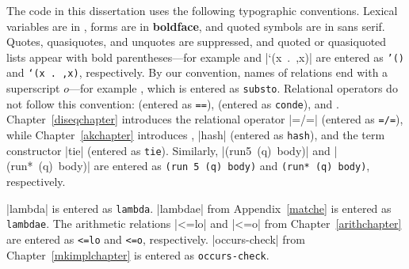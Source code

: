 The code in this dissertation uses the following typographic conventions.  Lexical variables are in , forms are in {\bf boldface}, and quoted symbols are in {\sf sans serif}.
Quotes, quasiquotes, and unquotes are suppressed,
and quoted or quasiquoted lists appear with bold parentheses---for example  and \mbox{\scheme|`(x . ,x)|} are entered as
\qqmagicoff 
\texttt{'()} and \mbox{\texttt{`(x . \!,x)}}, respectively.
\qqmagicon 
By our convention, names of relations end with a superscript $o$---for example , which is entered as {\tt substo}.  Relational operators do not follow this convention:  \scheme{==} (entered as {\tt ==}),  (entered as {\tt conde}), and .  Chapter~\ref{diseqchapter} introduces the relational operator \scheme|=/=| (entered as {\tt =/=}), while Chapter~\ref{akchapter} introduces , \scheme|hash| (entered as {\tt hash}), and the term constructor \scheme|tie| (entered as {\tt tie}).  Similarly, \mbox{\scheme|(run5 (q) body)|} and \mbox{\scheme|(run* (q) body)|} are entered as \mbox{{\tt (run 5 (q) body)}} and \mbox{{\tt (run* (q) body)}}, respectively.

\scheme|lambda| is entered as {\tt lambda}.
\scheme|lambdae| from Appendix~\ref{matche} is entered as {\tt lambdae}.
The arithmetic relations \scheme|<=lo| and \scheme|<=o| from
Chapter~\ref{arithchapter} are entered as {\tt <=lo} and {\tt <=o},
respectively. \scheme|occurs-check| from Chapter~\ref{mkimplchapter} 
is entered as {\tt occurs-check}.







